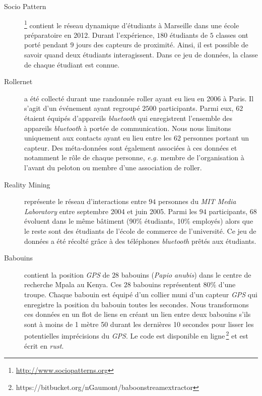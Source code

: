 \begin{description}
\item[Socio Pattern~\cite{Fournet2014}]\footnote{\url{http://www.sociopatterns.org}} contient le réseau dynamique d'étudiants à Marseille dans une école préparatoire en 2012. Durant l'expérience, $180$ étudiants de $5$ classes ont porté pendant $9$ jours des capteurs de proximité.
Ainsi, il est possible de savoir quand deux étudiants interagissent. 
Dans ce jeu de données, la classe de chaque étudiant est connue.\\

\item[Rollernet~\cite{Tournoux2009}] a été collecté durant une randonnée roller ayant eu lieu en 2006 à Paris.
Il s'agit d'un événement ayant regroupé $2500$ participants.
Parmi eux, $62$ étaient équipés d'appareils \emph{bluetooth} qui enregistrent l'ensemble des appareils \emph{bluetooth} à portée de communication.
Nous nous limitons uniquement aux contacts ayant eu lieu entre les $62$ personnes portant un capteur.
Des méta-données sont également associées à ces données et notamment le rôle de chaque personne, \emph{e.g.} membre de l'organisation à l'avant du peloton ou membre d'une association de roller.\\

\item[Reality Mining~\cite{Eagle2009}] représente le réseau d'interactions entre $94$ personnes du \emph{MIT Media Laboratory} entre septembre 2004 et juin 2005.
Parmi les $94$ participants, $68$ évoluent dans le même bâtiment (90\% étudiants, 10\% employés) alors que le reste sont des étudiants de l'école de commerce de l'université.
Ce jeu de données a été récolté grâce à des téléphones \emph{bluetooth} prêtés aux étudiants.\\

\item[Babouins~\cite{Crofoot2015,Strandburg-Peshkin2015}] contient la position \emph{GPS} de $28$ babouins (\emph{Papio anubis}) dans le centre de recherche Mpala au Kenya.
Ces $28$ babouins représentent $80\%$ d'une troupe.
Chaque babouin est équipé d'un collier muni d'un capteur \emph{GPS} qui enregistre la position du babouin toutes les secondes.
Nous transformons ces données en un flot de liens en créant un lien entre deux babouins s'ils sont à moins de 1 mètre 50 durant les dernières 10 secondes pour lisser les potentielles imprécisions du \emph{GPS}.
Le code est disponible en ligne\,\footnote{https://bitbucket.org/nGaumont/baboonstreamextractor} et est écrit en \emph{rust}.
\end{description}


